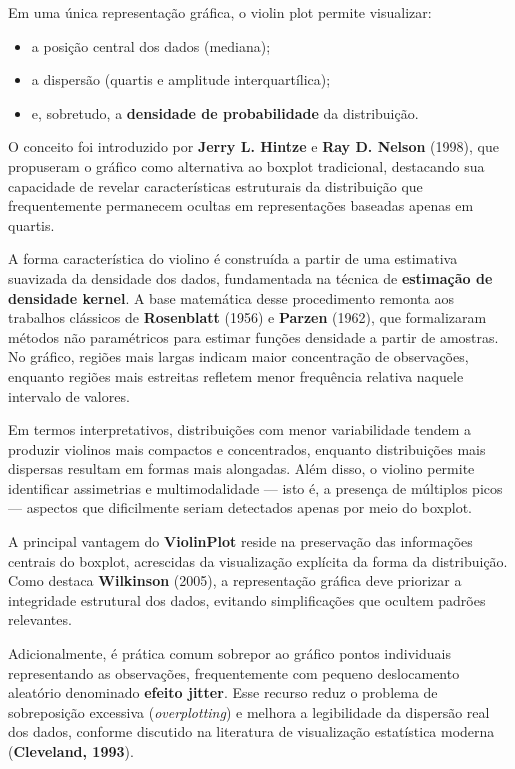 Em uma única representação gráfica, o violin plot permite visualizar: \vskip0.3cm


\begin{itemize}
    \item a posição central dos dados (mediana);
    \item a dispersão (quartis e amplitude interquartílica);
    \item e, sobretudo, a \textbf{densidade de probabilidade} da distribuição.
\end{itemize}

O conceito foi introduzido por \textbf{Jerry L. Hintze} e \textbf{Ray D. Nelson} (1998), que propuseram o gráfico como alternativa ao boxplot tradicional, destacando sua capacidade de revelar características estruturais da distribuição que frequentemente permanecem ocultas em representações baseadas apenas em quartis. 

\newpage
A forma característica do violino é construída a partir de uma estimativa suavizada da densidade dos dados, fundamentada na técnica de \textbf{estimação de densidade kernel}. A base matemática desse procedimento remonta aos trabalhos clássicos de \textbf{Rosenblatt} (1956) e \textbf{Parzen} (1962), que formalizaram métodos não paramétricos para estimar funções densidade a partir de amostras. No gráfico, regiões mais largas indicam maior concentração de observações, enquanto regiões mais estreitas refletem menor frequência relativa naquele intervalo de valores. \vskip0.3cm


Em termos interpretativos, distribuições com menor variabilidade tendem a produzir violinos mais compactos e concentrados, enquanto distribuições mais dispersas resultam em formas mais alongadas. Além disso, o violino permite identificar assimetrias e multimodalidade — isto é, a presença de múltiplos picos — aspectos que dificilmente seriam detectados apenas por meio do boxplot. \vskip0.3cm


A principal vantagem do \textbf{ViolinPlot} reside na preservação das informações centrais do boxplot, acrescidas da visualização explícita da forma da distribuição. Como destaca \textbf{Wilkinson} (2005), a representação gráfica deve priorizar a integridade estrutural dos dados, evitando simplificações que ocultem padrões relevantes. \vskip0.3cm


Adicionalmente, é prática comum sobrepor ao gráfico pontos individuais representando as observações, frequentemente com pequeno deslocamento aleatório denominado \textbf{efeito jitter}. Esse recurso reduz o problema de sobreposição excessiva (\textit{overplotting}) e melhora a legibilidade da dispersão real dos dados, conforme discutido na literatura de visualização estatística moderna (\textbf{Cleveland, 1993}).




